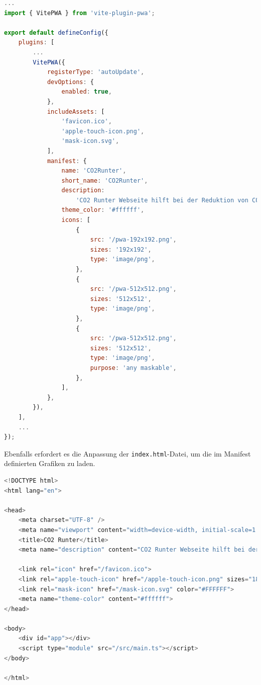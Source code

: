 \begin{lstlisting}[language={JavaScript}, caption={Angepasste Vite Konfiguration für PWA}]
...
import { VitePWA } from 'vite-plugin-pwa';

export default defineConfig({
    plugins: [
        ...
        VitePWA({
            registerType: 'autoUpdate',
            devOptions: {
                enabled: true,
            },
            includeAssets: [
                'favicon.ico',
                'apple-touch-icon.png',
                'mask-icon.svg',
            ],
            manifest: {
                name: 'CO2Runter',
                short_name: 'CO2Runter',
                description:
                    'CO2 Runter Webseite hilft bei der Reduktion von CO2',
                theme_color: '#ffffff',
                icons: [
                    {
                        src: '/pwa-192x192.png',
                        sizes: '192x192',
                        type: 'image/png',
                    },
                    {
                        src: '/pwa-512x512.png',
                        sizes: '512x512',
                        type: 'image/png',
                    },
                    {
                        src: '/pwa-512x512.png',
                        sizes: '512x512',
                        type: 'image/png',
                        purpose: 'any maskable',
                    },
                ],
            },
        }),
    ],
    ...
});
\end{lstlisting}

Ebenfalls erfordert es die Anpassung der \texttt{index.html}-Datei, um die im Manifest definierten Grafiken zu laden.

\begin{lstlisting}[language={JavaScript}, caption={Anpassungen an der index.html Datei}]
<!DOCTYPE html>
<html lang="en">

<head>
    <meta charset="UTF-8" />
    <meta name="viewport" content="width=device-width, initial-scale=1.0" />
    <title>CO2 Runter</title>
    <meta name="description" content="CO2 Runter Webseite hilft bei der Reduktion von CO2">

    <link rel="icon" href="/favicon.ico">
    <link rel="apple-touch-icon" href="/apple-touch-icon.png" sizes="180x180">
    <link rel="mask-icon" href="/mask-icon.svg" color="#FFFFFF">
    <meta name="theme-color" content="#ffffff">
</head>

<body>
    <div id="app"></div>
    <script type="module" src="/src/main.ts"></script>
</body>

</html>
\end{lstlisting}

